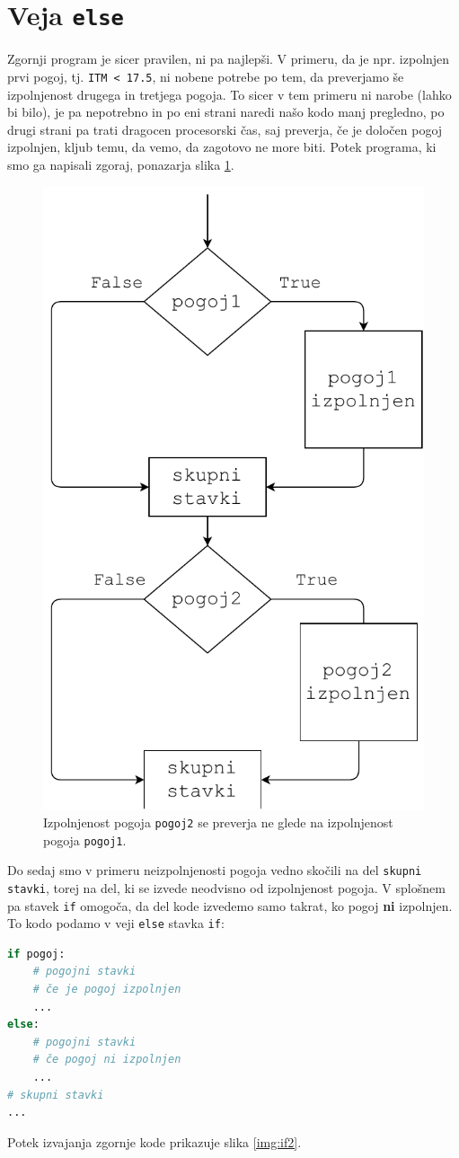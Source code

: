 \section{Veja \texttt{else}}

Zgornji program je sicer pravilen, ni pa najlepši. V primeru, da je npr. izpolnjen prvi pogoj, tj. \texttt{ITM < 17.5}, ni nobene potrebe po tem, da preverjamo še izpolnjenost drugega in tretjega pogoja. To sicer v tem primeru ni narobe (lahko bi bilo), je pa nepotrebno in po eni strani naredi našo kodo manj pregledno, po drugi strani pa trati dragocen procesorski čas, saj preverja, če je določen pogoj izpolnjen, kljub temu, da vemo, da zagotovo ne more biti. Potek programa, ki smo ga napisali zgoraj, ponazarja slika \ref{img:if21}.

\begin{figure}
    \centering
    \includegraphics[width=0.5\linewidth]{img/if21.pdf}
    \caption{Izpolnjenost pogoja \texttt{pogoj2} se preverja ne glede na izpolnjenost pogoja \texttt{pogoj1}.}
    \label{img:if21}
\end{figure}

Do sedaj smo v primeru neizpolnjenosti pogoja vedno skočili na del \texttt{skupni stavki}, torej na del, ki se izvede neodvisno od izpolnjenost pogoja. V splošnem pa stavek \texttt{if} omogoča, da del kode izvedemo samo takrat, ko pogoj \textbf{ni} izpolnjen. To kodo podamo v veji \texttt{else} stavka \texttt{if}:
\begin{lstlisting}[language=Python]
if pogoj:
    # pogojni stavki
    # če je pogoj izpolnjen
    ...
else:
    # pogojni stavki
    # če pogoj ni izpolnjen
    ...
# skupni stavki
...
\end{lstlisting}
Potek izvajanja zgornje kode prikazuje slika \ref{img:if2}. 

